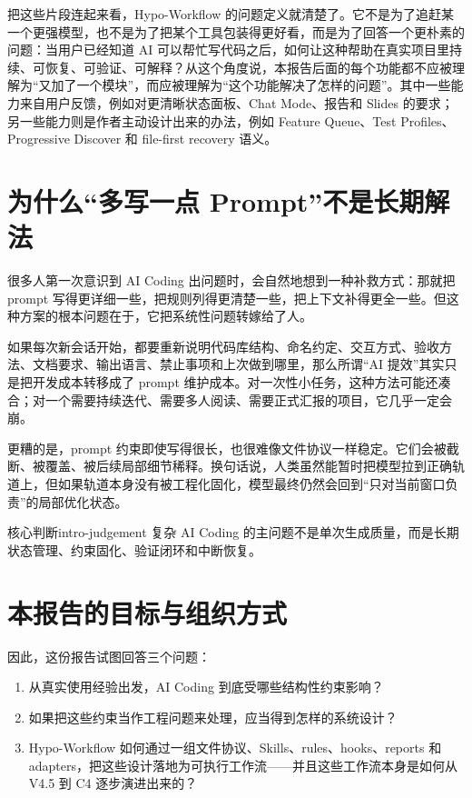 \documentclass[
  outputdir=build,
  chapterstyle=cn,
  colorscheme=Simple,
  fontset=tech,
  code=false
]{Hypo-Note}
\begin{document}
把这些片段连起来看，Hypo-Workflow 的问题定义就清楚了。它不是为了追赶某一个更强模型，也不是为了把某个工具包装得更好看，而是为了回答一个更朴素的问题：当用户已经知道 AI 可以帮忙写代码之后，如何让这种帮助在真实项目里持续、可恢复、可验证、可解释？从这个角度说，本报告后面的每个功能都不应被理解为“又加了一个模块”，而应被理解为“这个功能解决了怎样的问题”。其中一些能力来自用户反馈，例如对更清晰状态面板、Chat Mode、报告和 Slides 的要求；另一些能力则是作者主动设计出来的办法，例如 Feature Queue、Test Profiles、Progressive Discover 和 file-first recovery 语义。

\section{为什么“多写一点 Prompt”不是长期解法}

很多人第一次意识到 AI Coding 出问题时，会自然地想到一种补救方式：那就把 prompt 写得更详细一些，把规则列得更清楚一些，把上下文补得更全一些。但这种方案的根本问题在于，它把系统性问题转嫁给了人。

如果每次新会话开始，都要重新说明代码库结构、命名约定、交互方式、验收方法、文档要求、输出语言、禁止事项和上次做到哪里，那么所谓“AI 提效”其实只是把开发成本转移成了 prompt 维护成本。对一次性小任务，这种方法可能还凑合；对一个需要持续迭代、需要多人阅读、需要正式汇报的项目，它几乎一定会崩。

更糟的是，prompt 约束即使写得很长，也很难像文件协议一样稳定。它们会被截断、被覆盖、被后续局部细节稀释。换句话说，人类虽然能暂时把模型拉到正确轨道上，但如果轨道本身没有被工程化固化，模型最终仍然会回到“只对当前窗口负责”的局部优化状态。

\begin{important}{核心判断}{intro-judgement}
复杂 AI Coding 的主问题不是单次生成质量，而是长期状态管理、约束固化、验证闭环和中断恢复。
\end{important}

\section{本报告的目标与组织方式}

因此，这份报告试图回答三个问题：

\begin{enumerate}[leftmargin=2em]
  \item 从真实使用经验出发，AI Coding 到底受哪些结构性约束影响？
  \item 如果把这些约束当作工程问题来处理，应当得到怎样的系统设计？
  \item Hypo-Workflow 如何通过一组文件协议、Skills、rules、hooks、reports 和 adapters，把这些设计落地为可执行工作流——并且这些工作流本身是如何从 V4.5 到 C4 逐步演进出来的？
\end{enumerate}
\end{document}
